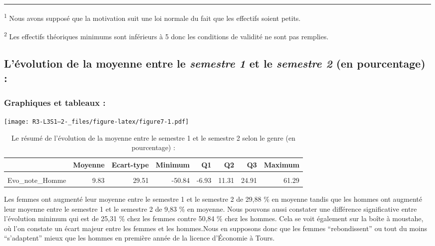 \documentclass[
  11pt,
  french,
]{article}
\begin{document}
\begin{center}\rule{0.5\linewidth}{0.5pt}\end{center}

\textsuperscript{1} Nous avons supposé que la motivation suit une loi
normale du fait que les effectifs soient petits.

\textsuperscript{2} Les effectifs théoriques minimums sont inférieurs à
5 donc les conditions de validité ne sont pas remplies.

\hypertarget{luxe9volution-de-la-moyenne-entre-le-semestre-1-et-le-semestre-2-en-pourcentage}{%
\subsection{\texorpdfstring{L'évolution de la moyenne entre le
\emph{semestre 1} et le \emph{semestre 2} (en pourcentage)
:}{L'évolution de la moyenne entre le semestre 1 et le semestre 2 (en pourcentage) :}}\label{luxe9volution-de-la-moyenne-entre-le-semestre-1-et-le-semestre-2-en-pourcentage}}

\hypertarget{graphiques-et-tableaux-1}{%
\subsubsection{Graphiques et tableaux
:}\label{graphiques-et-tableaux-1}}

\texttt{[image: R3-L3S1--2-\_files/figure-latex/figure7-1.pdf]}

\begin{table}[!h]

\caption{\label{tab:table6}Le résumé de l'évolution de la moyenne entre le semestre 1 et le semestre 2 selon le genre (en pourcentage) :}
\centering
\begin{tabular}[t]{lrrrrrrr}
\toprule
  & Moyenne & Ecart-type & Minimum & Q1 & Q2 & Q3 & Maximum\\
\midrule
\cellcolor{gray!6}{Evo\_note\_Femme} & \cellcolor{gray!6}{29.88} & \cellcolor{gray!6}{22.34} & \cellcolor{gray!6}{-25.31} & \cellcolor{gray!6}{20.59} & \cellcolor{gray!6}{26.54} & \cellcolor{gray!6}{38.13} & \cellcolor{gray!6}{77.87}\\
Evo\_note\_Homme & 9.83 & 29.51 & -50.84 & -6.93 & 11.31 & 24.91 & 61.29\\
\bottomrule
\end{tabular}
\end{table}

Les femmes ont augmenté leur moyenne entre le semestre 1 et le semestre
2 de 29,88 \% en moyenne tandis que les hommes ont augmenté leur moyenne
entre le semestre 1 et le semestre 2 de 9,83 \% en moyenne. Nous pouvons
aussi constater une différence significative entre l'évolution minimum
qui est de 25,31 \% chez les femmes contre 50,84 \% chez les hommes.
Cela se voit également sur la boîte à moustahe, où l'on constate un
écart majeur entre les femmes et les hommes.Nous en supposons donc que
les femmes ``rebondissent'' ou tout du moins ``s'adaptent'' mieux que
les hommes en première année de la licence d'Économie à Tours.
\end{document}
